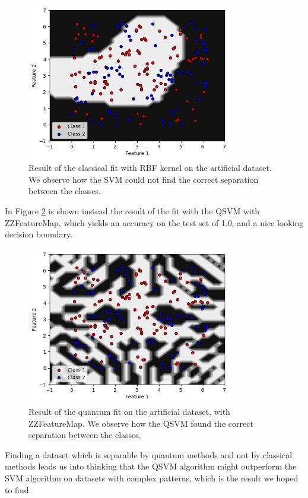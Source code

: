 \documentclass[12pt]{article}
\begin{document}
\begin{figure}[h!]
    \centering
    \includegraphics[width=0.8\textwidth]{images/adhocrbf.png}
    \caption{Result of the classical fit with RBF kernel on the artificial dataset. We observe how the SVM could not find the correct separation between the classes.}
    \label{fig:adhocrbf}
\end{figure}
In Figure \ref{fig:adhoczz} is shown instead the result of the fit with the QSVM with ZZFeatureMap, which yields an accuracy on the test set of 1.0, and a nice looking decision boundary. 
\begin{figure}[h!]
    \centering
    \includegraphics[width=0.8\textwidth]{images/adhoczz.png}
    \caption{Result of the quantum fit on the artificial dataset, with ZZFeatureMap. We observe how the QSVM found the correct separation between the classes.}
    \label{fig:adhoczz}
\end{figure}

Finding a dataset which is separable by quantum methods and not by classical methods leads us into thinking that the QSVM algorithm might outperform the SVM algorithm on datasets with complex patterns, which is the result we hoped to find. 
\end{document}
